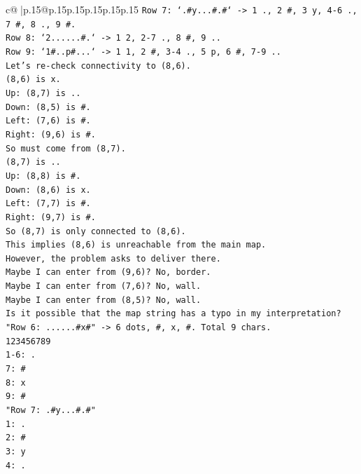 \documentclass{article}
\begin{document}
{\begin{supertabular}{c@{$\;$}|p{.15\linewidth}@{}p{.15\linewidth}p{.15\linewidth}p{.15\linewidth}p{.15\linewidth}p{.15\linewidth}}
{{{\texttt{Row 7: `.\#y...\#.\#` {-}> 1 ., 2 \#, 3 y, 4{-}6 ., 7 \#, 8 ., 9 \#.} \\
\texttt{Row 8: `2......\#.` {-}> 1 2, 2{-}7 ., 8 \#, 9 ..} \\
\texttt{Row 9: `1\#..p\#...` {-}> 1 1, 2 \#, 3{-}4 ., 5 p, 6 \#, 7{-}9 ..} \\
\texttt{Let's re{-}check connectivity to (8,6).} \\
\texttt{(8,6) is x.} \\
\texttt{Up: (8,7) is ..} \\
\texttt{Down: (8,5) is \#.} \\
\texttt{Left: (7,6) is \#.} \\
\texttt{Right: (9,6) is \#.} \\
\texttt{So must come from (8,7).} \\
\texttt{(8,7) is ..} \\
\texttt{Up: (8,8) is \#.} \\
\texttt{Down: (8,6) is x.} \\
\texttt{Left: (7,7) is \#.} \\
\texttt{Right: (9,7) is \#.} \\
\texttt{So (8,7) is only connected to (8,6).} \\
\texttt{This implies (8,6) is unreachable from the main map.} \\
\texttt{However, the problem asks to deliver there.} \\
\texttt{Maybe I can enter from (9,6)? No, border.} \\
\texttt{Maybe I can enter from (7,6)? No, wall.} \\
\texttt{Maybe I can enter from (8,5)? No, wall.} \\
\texttt{Is it possible that the map string has a typo in my interpretation?} \\
\texttt{"Row 6: ......\#x\#" {-}> 6 dots, \#, x, \#. Total 9 chars.} \\
\texttt{123456789} \\
\texttt{1{-}6: .} \\
\texttt{7: \#} \\
\texttt{8: x} \\
\texttt{9: \#} \\
\texttt{"Row 7: .\#y...\#.\#"} \\
\texttt{1: .} \\
\texttt{2: \#} \\
\texttt{3: y} \\
\texttt{4: .} \\
}}}
\end{supertabular}}
\end{document}
